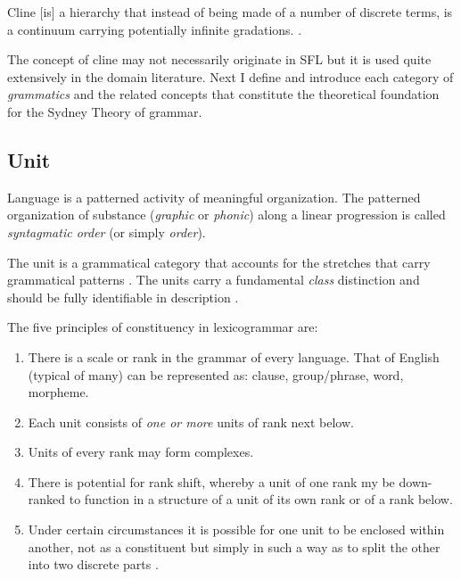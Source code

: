 \begin{definition}[Cline]\label{def:cline}
	Cline [is] a hierarchy that instead of being made of a number of discrete terms, is a continuum carrying potentially infinite gradations.
	\citep[42]{Halliday2002}. 
\end{definition}

The concept of cline may not necessarily originate in SFL but it is used quite extensively in the domain literature.
Next I define and introduce each category of \textit{grammatics} and the related concepts that constitute the theoretical foundation for the Sydney Theory of grammar.

\subsection{Unit}
\label{sec:unit-sydney}
Language is a patterned activity of meaningful organization. The patterned organization of substance (\textit{graphic} or \textit{phonic}) along a linear progression is called \textit{syntagmatic order} (or simply \textit{order}). 

\begin{definition}[Unit]\label{def:unit}
	The unit is a grammatical category that accounts for the stretches that carry grammatical patterns \citep[42]{Halliday2002}.
	The units carry a fundamental \textit{class} distinction and should be fully identifiable in description \citep[45]{Halliday2002}.
\end{definition}

\begin{generalization}\label{def:constituency-principles}
	The five principles of constituency in lexicogrammar are:
	\begin{enumerate}
		\item There is a scale or rank in the grammar of every language. That of English (typical of many) can be represented as: clause, group/phrase, word, morpheme.
		\item Each unit consists of \textit{one or more} units of rank next below.
		\item Units of every rank may form complexes.
		\item\label{item:downrank} There is potential for rank shift, whereby a unit of one rank my be down-ranked to function in a structure of a unit of its own rank or of a rank below.
		\item\label{item:unit-split} Under certain circumstances it is possible for one unit to be enclosed within another, not as a constituent but simply in such a way as to split the other into two discrete parts \citep[9--10]{Halliday2013}.
	\end{enumerate}
\end{generalization}

